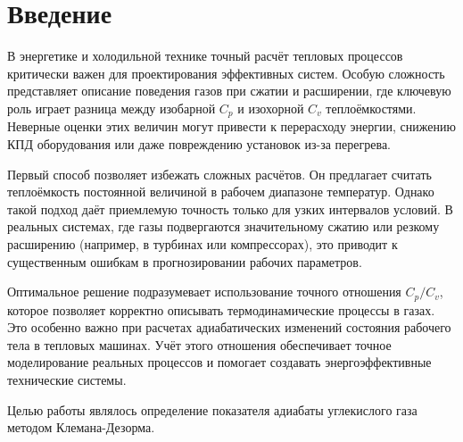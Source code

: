 \chapter{Введение}
\label{ch:intro}

В энергетике и холодильной технике точный расчёт тепловых процессов критически важен для проектирования эффективных систем. Особую сложность представляет описание поведения газов при сжатии и расширении, где ключевую роль играет разница между изобарной $C_p$ и изохорной $C_v$ теплоёмкостями. Неверные оценки этих величин могут привести к перерасходу энергии, снижению КПД оборудования или даже повреждению установок из-за перегрева.

Первый способ позволяет избежать сложных расчётов. Он предлагает считать теплоёмкость постоянной величиной в рабочем диапазоне температур. Однако такой подход даёт приемлемую точность только для узких интервалов условий. В реальных системах, где газы подвергаются значительному сжатию или резкому расширению (например, в турбинах или компрессорах), это приводит к существенным ошибкам в прогнозировании рабочих параметров.

Оптимальное решение подразумевает использование точного отношения $C_p/C_v$, которое позволяет корректно описывать термодинамические процессы в газах. Это особенно важно при расчетах адиабатических изменений состояния рабочего тела в тепловых машинах. Учёт этого отношения обеспечивает точное моделирование реальных процессов и помогает создавать энергоэффективные технические системы.

Целью работы являлось определение показателя адиабаты углекислого газа методом Клемана-Дезорма.
